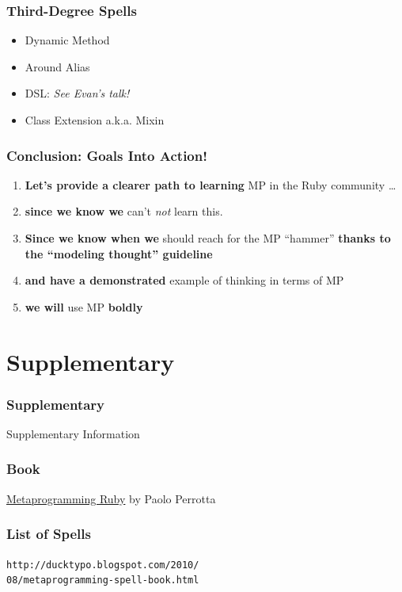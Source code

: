 \documentclass[slidestop,compress,mathserif]{beamer}
\begin{document}
\begin{frame}
	\frametitle{Third-Degree Spells}
	\begin{itemize}
		\item Dynamic Method
		\item Around Alias
		\item DSL:  \emph{See Evan's talk!}
		\item Class Extension a.k.a. Mixin
	\end{itemize}
\end{frame}

\begin{frame}
	\frametitle{Conclusion:  Goals Into Action!}
	\begin{enumerate}
		\item \textbf{Let's provide a clearer path to learning} MP in the Ruby community \ldots
		\pause
		\item \textbf{since we know we} can't \emph{not} learn this.
		\pause
		\item \textbf{Since we know when we} should reach for the MP ``hammer'' \textbf{thanks to the ``modeling thought'' guideline}
		\pause
		\item \textbf{and have a demonstrated} example of thinking in terms of MP
		\pause
		\item \textbf{we will} use MP \textbf{boldly}
	\end{enumerate}
\end{frame}

\section{Supplementary} %
\label{sec:supplementary}

\begin{frame}
	\frametitle{Supplementary}
	\begin{center}
		Supplementary Information
	\end{center}
\end{frame}

\begin{frame}
	\frametitle{Book}
	\underline{Metaprogramming Ruby} by Paolo Perrotta
\end{frame}

\begin{frame}
	\frametitle{List of Spells}
	\texttt{http://ducktypo.blogspot.com/2010/\\08/metaprogramming-spell-book.html}
\end{frame}
\end{document}
